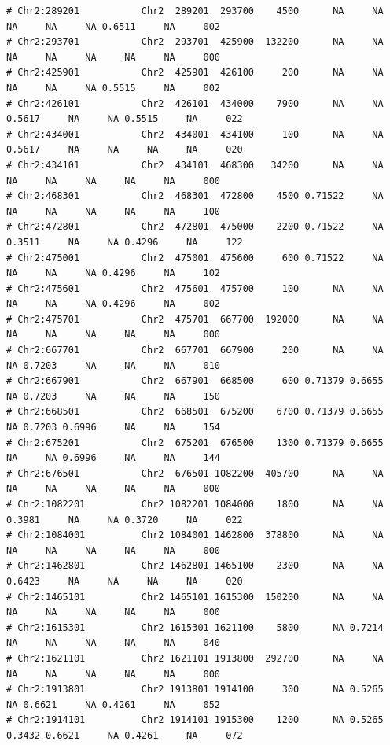 \documentclass{article}\usepackage[]{graphicx}\usepackage[]{color}
\makeatletter
\newenvironment{kframe}{%
 \def\at@end@of@kframe{}%
 \ifinner\ifhmode%
  \def\at@end@of@kframe{\end{minipage}}%
  \begin{minipage}{\columnwidth}%
 \fi\fi%
 \def\FrameCommand##1{\hskip\@totalleftmargin \hskip-\fboxsep
 \colorbox{shadecolor}{##1}\hskip-\fboxsep
     \hskip-\linewidth \hskip-\@totalleftmargin \hskip\columnwidth}%
 \MakeFramed {\advance\hsize-\width
   \@totalleftmargin\z@ \linewidth\hsize
   \@setminipage}}%
 {\par\unskip\endMakeFramed%
 \at@end@of@kframe}
\newenvironment{knitrout}{}{} %
\makeatother
\begin{document}
\begin{knitrout}
\begin{kframe}
\begin{verbatim}
# Chr2:289201           Chr2  289201  293700    4500      NA     NA     NA     NA     NA 0.6511     NA     002
# Chr2:293701           Chr2  293701  425900  132200      NA     NA     NA     NA     NA     NA     NA     000
# Chr2:425901           Chr2  425901  426100     200      NA     NA     NA     NA     NA 0.5515     NA     002
# Chr2:426101           Chr2  426101  434000    7900      NA     NA 0.5617     NA     NA 0.5515     NA     022
# Chr2:434001           Chr2  434001  434100     100      NA     NA 0.5617     NA     NA     NA     NA     020
# Chr2:434101           Chr2  434101  468300   34200      NA     NA     NA     NA     NA     NA     NA     000
# Chr2:468301           Chr2  468301  472800    4500 0.71522     NA     NA     NA     NA     NA     NA     100
# Chr2:472801           Chr2  472801  475000    2200 0.71522     NA 0.3511     NA     NA 0.4296     NA     122
# Chr2:475001           Chr2  475001  475600     600 0.71522     NA     NA     NA     NA 0.4296     NA     102
# Chr2:475601           Chr2  475601  475700     100      NA     NA     NA     NA     NA 0.4296     NA     002
# Chr2:475701           Chr2  475701  667700  192000      NA     NA     NA     NA     NA     NA     NA     000
# Chr2:667701           Chr2  667701  667900     200      NA     NA     NA 0.7203     NA     NA     NA     010
# Chr2:667901           Chr2  667901  668500     600 0.71379 0.6655     NA 0.7203     NA     NA     NA     150
# Chr2:668501           Chr2  668501  675200    6700 0.71379 0.6655     NA 0.7203 0.6996     NA     NA     154
# Chr2:675201           Chr2  675201  676500    1300 0.71379 0.6655     NA     NA 0.6996     NA     NA     144
# Chr2:676501           Chr2  676501 1082200  405700      NA     NA     NA     NA     NA     NA     NA     000
# Chr2:1082201          Chr2 1082201 1084000    1800      NA     NA 0.3981     NA     NA 0.3720     NA     022
# Chr2:1084001          Chr2 1084001 1462800  378800      NA     NA     NA     NA     NA     NA     NA     000
# Chr2:1462801          Chr2 1462801 1465100    2300      NA     NA 0.6423     NA     NA     NA     NA     020
# Chr2:1465101          Chr2 1465101 1615300  150200      NA     NA     NA     NA     NA     NA     NA     000
# Chr2:1615301          Chr2 1615301 1621100    5800      NA 0.7214     NA     NA     NA     NA     NA     040
# Chr2:1621101          Chr2 1621101 1913800  292700      NA     NA     NA     NA     NA     NA     NA     000
# Chr2:1913801          Chr2 1913801 1914100     300      NA 0.5265     NA 0.6621     NA 0.4261     NA     052
# Chr2:1914101          Chr2 1914101 1915300    1200      NA 0.5265 0.3432 0.6621     NA 0.4261     NA     072

\end{verbatim}
\end{kframe}
\end{knitrout}
\end{document}
